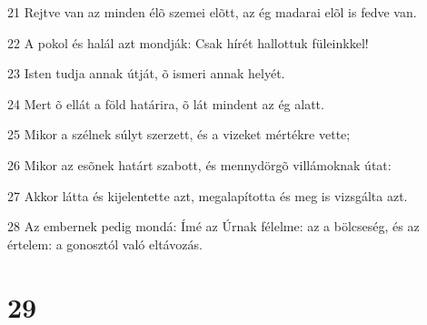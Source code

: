 \par 21 Rejtve van az minden élõ szemei elõtt, az ég madarai elõl is fedve van.
\par 22 A pokol és halál azt mondják: Csak hírét hallottuk füleinkkel!
\par 23 Isten tudja annak útját, õ ismeri annak helyét.
\par 24 Mert õ ellát a föld határira, õ lát mindent az ég alatt.
\par 25 Mikor a szélnek súlyt szerzett, és a vizeket mértékre vette;
\par 26 Mikor az esõnek határt szabott, és mennydörgõ villámoknak útat:
\par 27 Akkor látta és kijelentette azt, megalapította és meg is vizsgálta azt.
\par 28 Az embernek pedig mondá: Ímé az Úrnak félelme: az a bölcseség, és az értelem: a gonosztól való eltávozás.

\chapter{29}


